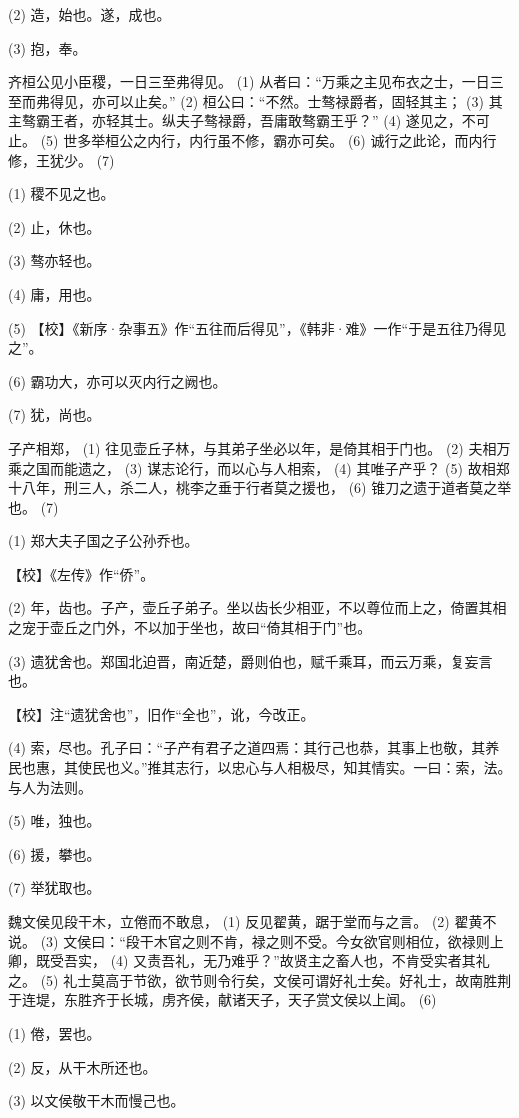 \documentclass[12pt,UTF8]{ctexbook}
\begin{document}
(2) 造，始也。遂，成也。

(3) 抱，奉。

齐桓公见小臣稷，一日三至弗得见。 (1) 从者曰：“万乘之主见布衣之士，一日三至而弗得见，亦可以止矣。” (2) 桓公曰：“不然。士骜禄爵者，固轻其主； (3) 其主骜霸王者，亦轻其士。纵夫子骜禄爵，吾庸敢骜霸王乎？” (4) 遂见之，不可止。 (5) 世多举桓公之内行，内行虽不修，霸亦可矣。 (6) 诚行之此论，而内行修，王犹少。 (7)

(1) 稷不见之也。

(2) 止，休也。

(3) 骜亦轻也。

(4) 庸，用也。

(5) 【校】《新序·杂事五》作“五往而后得见”，《韩非·难》一作“于是五往乃得见之”。

(6) 霸功大，亦可以灭内行之阙也。

(7) 犹，尚也。

子产相郑， (1) 往见壶丘子林，与其弟子坐必以年，是倚其相于门也。 (2) 夫相万乘之国而能遗之， (3) 谋志论行，而以心与人相索， (4) 其唯子产乎？ (5) 故相郑十八年，刑三人，杀二人，桃李之垂于行者莫之援也， (6) 锥刀之遗于道者莫之举也。 (7)

(1) 郑大夫子国之子公孙乔也。

【校】《左传》作“侨”。

(2) 年，齿也。子产，壶丘子弟子。坐以齿长少相亚，不以尊位而上之，倚置其相之宠于壶丘之门外，不以加于坐也，故曰“倚其相于门”也。

(3) 遗犹舍也。郑国北迫晋，南近楚，爵则伯也，赋千乘耳，而云万乘，复妄言也。

【校】注“遗犹舍也”，旧作“全也”，讹，今改正。

(4) 索，尽也。孔子曰：“子产有君子之道四焉：其行己也恭，其事上也敬，其养民也惠，其使民也义。”推其志行，以忠心与人相极尽，知其情实。一曰：索，法。与人为法则。

(5) 唯，独也。

(6) 援，攀也。

(7) 举犹取也。

魏文侯见段干木，立倦而不敢息， (1) 反见翟黄，踞于堂而与之言。 (2) 翟黄不说。 (3) 文侯曰：“段干木官之则不肯，禄之则不受。今女欲官则相位，欲禄则上卿，既受吾实， (4) 又责吾礼，无乃难乎？”故贤主之畜人也，不肯受实者其礼之。 (5) 礼士莫高于节欲，欲节则令行矣，文侯可谓好礼士矣。好礼士，故南胜荆于连堤，东胜齐于长城，虏齐侯，献诸天子，天子赏文侯以上闻。 (6)

(1) 倦，罢也。

(2) 反，从干木所还也。

(3) 以文侯敬干木而慢己也。
\end{document}
